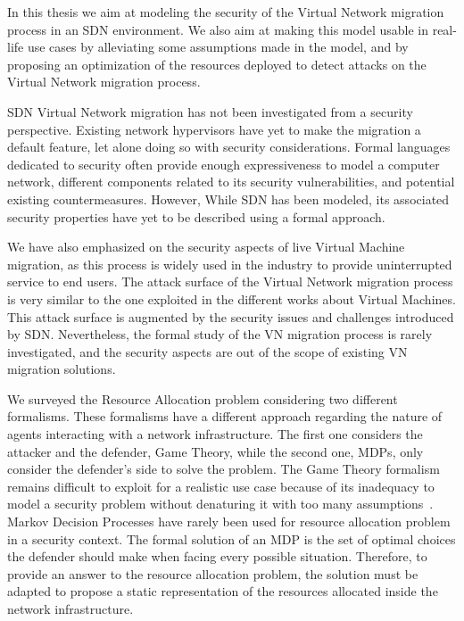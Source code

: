 In this thesis we aim at modeling the security of the Virtual Network migration process in an SDN environment.
We also aim at making this model usable in real-life use cases by alleviating some assumptions made in the model, and by proposing an optimization of the resources deployed to detect attacks on the Virtual Network migration process.

SDN Virtual Network migration has not been investigated from a security perspective.
Existing network hypervisors have yet to make the migration a default feature, let alone doing so with security considerations.
Formal languages dedicated to security often provide enough expressiveness to model a computer network, different components related to its security vulnerabilities, and potential existing countermeasures.
However, While SDN has been modeled, its associated security properties have yet to be described using a formal approach.

We have also emphasized on the security aspects of live Virtual Machine migration, as this process is widely used in the industry to provide uninterrupted service to end users. 
The attack surface of the Virtual Network migration process is very similar to the one exploited in the different works about Virtual Machines. This attack surface is augmented by the security issues and challenges introduced by SDN. Nevertheless, the formal study of the VN migration process is rarely investigated, and the security aspects are out of the scope of existing VN migration solutions.

We surveyed the Resource Allocation problem considering two different formalisms. These formalisms have a different approach regarding the nature of agents interacting with a network infrastructure. The first one considers the attacker and the defender, \ie Game Theory, while the second one, \ie MDPs, only consider the defender's side to solve the problem.
The Game Theory formalism remains difficult to exploit for a realistic use case because of its inadequacy to model a security problem without denaturing it with too many assumptions~\cite{Kiennert2018}.
Markov Decision Processes have rarely been used for resource allocation problem in a security context. The formal solution of an MDP is the set of optimal choices the defender should make when facing every possible situation. Therefore, to provide an answer to the resource allocation problem, the solution must be adapted to propose a static representation of the resources allocated inside the network infrastructure.


